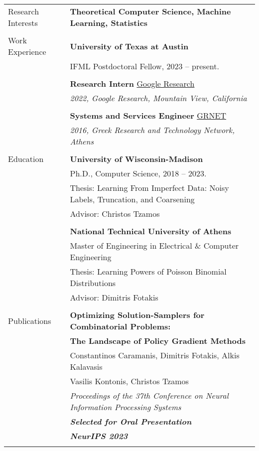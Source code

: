 \documentclass[letterpaper,11pt,oneside]{article}
\begin{document}
\noindent \begin{longtable}{@{} l l}
\Large{Research Interests} & \textbf{Theoretical Computer Science, Machine Learning, Statistics}
\\
&\\

\Large{Work Experience}

  & \textbf{University of Texas at Austin} \\
  & IFML Postdoctoral Fellow, 2023 -- present. \\
  & \\

  &\textbf{Research Intern} \href{https://research.google}{Google Research}\\
  & \emph{2022, Google Research, Mountain View, California}\\
  &\\
  
  &\textbf{Systems and Services Engineer} \href{https://grnet.gr/}{GRNET}\\
  & \emph{2016, Greek Research and Technology Network, Athens}\\
  &\\

 \Large{Education}


     & \textbf{University of Wisconsin-Madison} \\
     & Ph.D., Computer Science, 2018 -- 2023. \\
     & Thesis: Learning From Imperfect Data: Noisy Labels, Truncation, and Coarsening \\
     & Advisor: Christos Tzamos\\
     & \\

     & \textbf{National Technical University of Athens} \\
     & Master of Engineering in Electrical \& Computer Engineering\\
     & Thesis: Learning Powers of Poisson Binomial Distributions\\
     & Advisor: Dimitris Fotakis \\
     & \\

 \Large{Publications}

 &\textbf{Optimizing Solution-Samplers for Combinatorial Problems:}\\
 &\textbf{The Landscape of Policy Gradient Methods}\\
 & Constantinos Caramanis, Dimitris Fotakis, Alkis Kalavasis\\
 & Vasilis Kontonis, Christos Tzamos\\
& \emph{Proceedings of the 37th Conference on Neural Information Processing Systems} \\
& \emph{\textbf{Selected for Oral Presentation}} \\
& \emph{\textbf{NeurIPS 2023}} \\
 & \\


\end{longtable}
\end{document}
